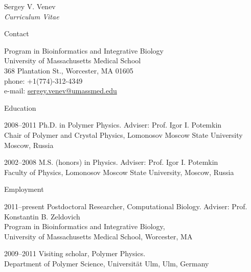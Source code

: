 \documentclass[10pt]{article}
\begin{document}




\newlength{\oldcvlabelwidth}
\renewcommand*{\cvbibname}{}

\begin{cv}{Sergey V. Venev\\{\large \itshape Curriculum Vitae}}

\begin{cvlist}{Contact}
    \item Program in Bioinformatics and Integrative Biology\\
    University of Massachusetts Medical School\\
    368 Plantation St., Worcester, MA 01605\\
    phone: +1(774)-312-4349\\
    e-mail: \href{mailto:sergey.venev@umassmed.edu}{sergey.venev@umassmed.edu}
\end{cvlist}


\begin{cvlist}{Education}
    \item[2008--2011] Ph.D. in Polymer Physics. Adviser: Prof. Igor I. Potemkin\\
    Chair of Polymer and Crystal Physics, Lomonosov Moscow State University\\
    Moscow, Russia  
    \item[2002--2008] M.S. (honors) in Physics. Adviser: Prof. Igor I. Potemkin\\
    Faculty of Physics, Lomonosov Moscow State University,
    Moscow, Russia  
\end{cvlist}



\begin{cvlist}{Employment}
    \item[2011--present] Postdoctoral Researcher, Computational Biology. Adviser: Prof. Konstantin B. Zeldovich\\
    Program in Bioinformatics and Integrative Biology,\\ University of Massachusetts Medical School,
    Worcester, MA   
    \item[2009--2011] Visiting scholar, Polymer Physics. \\
    Department of Polymer Science, Universit{\"a}t Ulm,
    Ulm, Germany  
\end{cvlist}




\end{cv}
\end{document}
